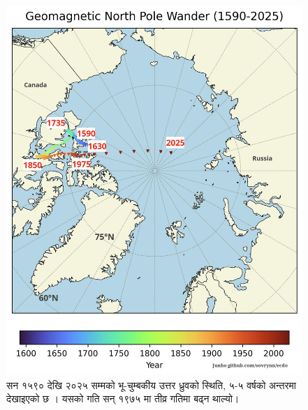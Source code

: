 \documentclass[10pt,twocolumn,letterpaper]{article}
\begin{document}
\begin{figure}[t]
\begin{center}
   \includegraphics[width=1\linewidth]{npw.jpg}
\end{center}
   \caption{सन १५९० देखि २०२५ सम्मको भू-चुम्बकीय उत्तर ध्रुवको स्थिति, ५-५ वर्षको अन्तरमा देखाइएको छ \cite{41}। यसको गति सन् १९७५ मा तीव्र गतिमा बढ्न थाल्यो।}
\label{fig:13}
\label{fig:onecol}
\end{figure}
\end{document}
